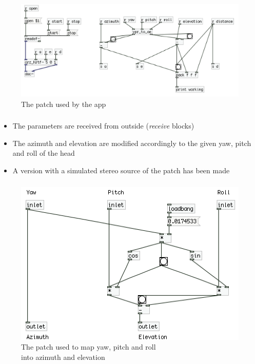\documentclass{beamer}
\begin{document}
	\begin{frame}
		\frametitle{\insertsection}
		\begin{figure}
			\centering
			  \includegraphics[width=1.0\textwidth]{images/iOS_patch.png}
			  \caption{The patch used by the app}
			  \label{fig:ios_pd}
		\end{figure}
	\end{frame}

	\begin{frame}
		\frametitle{\insertsection}
		\begin{itemize}
			\item The parameters are received from outside ({\em receive} blocks)
			\item The azimuth and elevation are modified accordingly to
				the given yaw, pitch and roll of the head
			\item A version with a simulated stereo source of the patch has been made
		\end{itemize}
	\end{frame}

	\begin{frame}
		\frametitle{\insertsection}
		\begin{figure}
			\centering
			\includegraphics[width=1.0\textheight]{images/iOS_patch_conversion.png}
			\caption{The patch used to map yaw, pitch and roll\\into azimuth and elevation}
		\end{figure}
	\end{frame}
\end{document}
